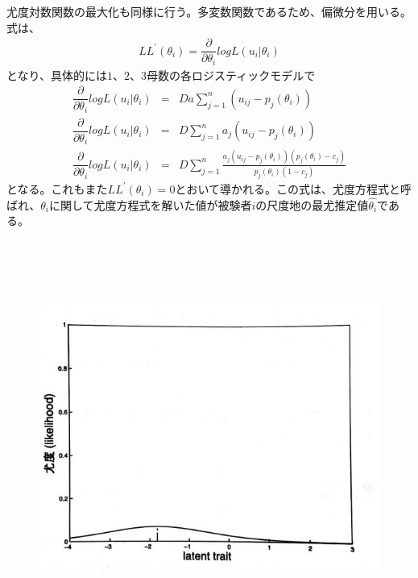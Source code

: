\documentclass[12pt]{jarticle}
\begin{document}
尤度対数関数の最大化も同様に行う。多変数関数であるため、偏微分を用いる。式は、
\begin{eqnarray}
  \label{06}
  \displaystyle LL^{\prime} (\theta_i) = \dfrac{\partial}{\partial \theta_i}log L(u_i|\theta_i)
\end{eqnarray}
となり、具体的には$1$、$2$、$3$母数の各ロジスティックモデルで
\begin{eqnarray}
  \label{07}
  \displaystyle \dfrac{\partial}{\partial \theta_i}log L(u_i|\theta_i) &=& Da \sum_{j = 1}^{n} (u_{ij} - p_j (\theta_i))  \\
  \dfrac{\partial}{\partial \theta_i}log L(u_i|\theta_i) &=& D \sum_{j = 1}^{n} a_j(u_{ij} - p_j (\theta_i)) \\
  \dfrac{\partial}{\partial \theta_i}log L(u_i|\theta_i) &=& D \sum_{j = 1}^{n} \frac{a_j(u_{ij} - p_j (\theta_i))(p_j (\theta_i) - c_j)}{p_j (\theta_i)(1 - c_j)}
\end{eqnarray}
となる。これもまた$LL^{\prime} (\theta_i) = 0$とおいて導かれる。この式は、尤度方程式と呼ばれ、$\theta_i$に関して尤度方程式を解いた値が被験者$i$の尺度地の最尤推定値$\hat{\theta_i}$である。\\
\\
\\
\\
\\
\begin{figure}[H]
  \includegraphics[bb = 50 250 1 1,scale = 0.45]{1.jpg}
\end{figure}
\end{document}
